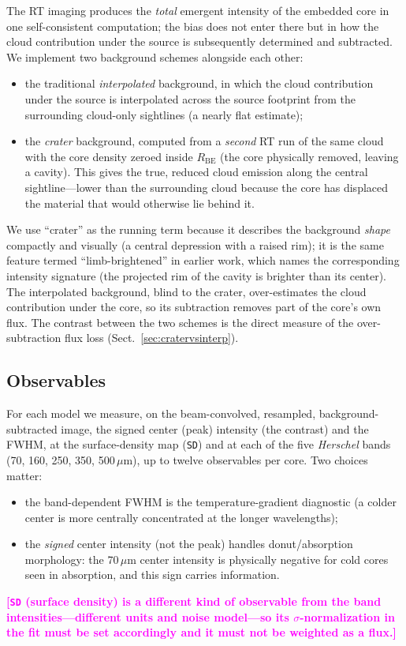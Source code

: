 \documentclass[11pt,a4paper]{article}
\newcommand{\note}[1]{\textcolor{magenta}{\textbf{[#1]}}}
\newcommand{\Rbe}{R_{\mathrm{BE}}}
\begin{document}
The RT imaging produces the \emph{total} emergent intensity of the
embedded core in one self-consistent computation; the bias does not enter
there but in
how the cloud contribution under the source is subsequently determined and
subtracted. We implement two background schemes alongside each other:
\begin{itemize}
  \item the traditional \emph{interpolated} background, in which the
        cloud contribution under the source is interpolated across the
        source footprint from the surrounding cloud-only sightlines (a
        nearly flat estimate);
  \item the \emph{crater} background, computed from a \emph{second} RT run of
        the same cloud with the core density zeroed inside $\Rbe$ (the core
        physically removed, leaving a cavity). This gives the true,
        reduced cloud emission along the central sightline---lower than the
        surrounding cloud because the core has displaced the material that
        would otherwise lie behind it.
\end{itemize}
We use ``crater'' as the running term because it describes the background
\emph{shape} compactly and visually (a central depression with a raised
rim); it is the same feature termed ``limb-brightened'' in earlier work,
which names the corresponding intensity signature (the projected rim of the
cavity is brighter than its center). The interpolated background, blind to
the crater, over-estimates the cloud contribution under the core, so its
subtraction removes part of the core's own flux. The contrast between the
two schemes is the direct measure of the over-subtraction flux loss
(Sect.~\ref{sec:cratervsinterp}).

\subsection{Observables}
\label{sec:observables}

For each model we measure, on the beam-convolved, resampled, background-
subtracted image, the signed center (peak) intensity (the contrast) and the
FWHM, at the surface-density map (\texttt{SD}) and at each of the five
\emph{Herschel} bands (70, 160, 250, 350, 500\,$\mu$m), up to twelve
observables per core. Two choices matter:
\begin{itemize}
  \item the band-dependent FWHM is the temperature-gradient diagnostic
        (a colder center is more centrally concentrated at the longer
        wavelengths);
  \item the \emph{signed} center intensity (not the peak) handles
        donut/absorption morphology: the 70\,$\mu$m center intensity is
        physically negative for cold cores seen in absorption, and this
        sign carries information.
\end{itemize}
\note{\texttt{SD} (surface density) is a different kind of observable from
the band intensities---different units and noise model---so its
$\sigma$-normalization in the fit must be set accordingly and it must not be
weighted as a flux.}
\end{document}
